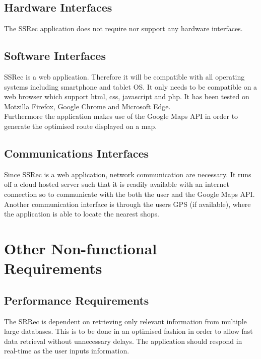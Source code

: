 \documentclass[10pt, a4paper, onecolumn]{scrartcl}
\begin{document}
		\subsection{Hardware Interfaces}
		
		The SSRec application does not require nor support any hardware interfaces.
		
		\subsection{Software Interfaces}
		
		SSRec is a web application. Therefore it will be compatible with all operating systems including smartphone and tablet OS. It only needs to be compatible on a web browser which support html, css, javascript and php. It has been tested on Motzilla Firefox, Google Chrome and Microsoft Edge.\\
		
		Furthermore the application makes use of the Google Maps API in order to generate the optimised route displayed on a map.
		
		\subsection{Communications Interfaces}
		
		Since SSRec is a web application, network communication are necessary. It runs off a cloud hosted server such that it is readily available with an internet connection so to communicate with the both the user and the Google Maps API. Another communication interface is through the users GPS (if available), where the application is able to locate the nearest shops.
	
	\section{Other Non-functional Requirements}
	
		\subsection{Performance Requirements}
		
		The SRRec is dependent on retrieving only relevant information from multiple large databases. This is to be done in an optimised fashion in order to allow fast data retrieval without unnecessary delays. The application should respond in real-time as the user inputs information.\\
		
\end{document}
